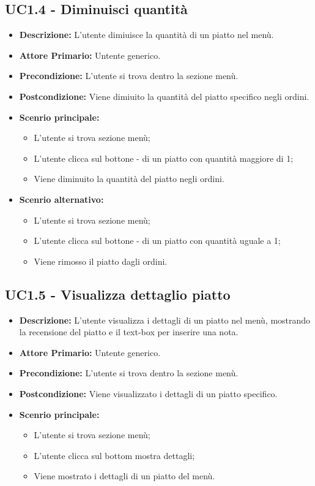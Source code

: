 \subsection{UC1.4 - Diminuisci quantità}
\begin{itemize}
    \item \textbf{Descrizione:} L'utente dimiuisce la quantità di un piatto nel menù.
    \item \textbf{Attore Primario:} Untente generico.
    \item \textbf{Precondizione:} L'utente si trova dentro la sezione menù.
    \item \textbf{Postcondizione:} Viene dimiuito la quantità del piatto specifico negli ordini.
    \item \textbf{Scenrio principale:}
    \begin{itemize}
        \item L'utente si trova sezione menù;
        \item L'utente clicca sul bottone - di un piatto con quantità maggiore di 1;
        \item Viene diminuito la quantità del piatto negli ordini.
    \end{itemize}
    \item \textbf{Scenrio alternativo:}
    \begin{itemize}
        \item L'utente si trova sezione menù;
        \item L'utente clicca sul bottone - di un piatto con quantità uguale a 1;
        \item Viene rimosso il piatto dagli ordini.
    \end{itemize}
\end{itemize}
\subsection{UC1.5 - Visualizza dettaglio piatto}
\begin{itemize}
    \item \textbf{Descrizione:} L'utente visualizza i dettagli di un piatto nel menù, mostrando la recensione del piatto e il text-box\gl{} per inserire una nota.
    \item \textbf{Attore Primario:} Untente generico.
    \item \textbf{Precondizione:} L'utente si trova dentro la sezione menù.
    \item \textbf{Postcondizione:} Viene visualizzato i dettagli di un piatto specifico.
    \item \textbf{Scenrio principale:}  
    \begin{itemize}
        \item L'utente si trova sezione menù;
        \item L'utente clicca sul bottom mostra dettagli;
        \item Viene mostrato i dettagli di un piatto del menù.
    \end{itemize}
\end{itemize}
